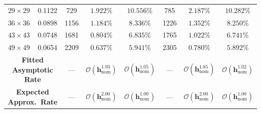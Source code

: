 \documentclass[VANCOUVER,Times1COL]{WileyNJD-v5}
\begin{document}
\begin{table}[!t]
{\begin{tabular}{cc|ccc|ccc}
            $29 \times 29$                                       & 0.1122                                       & 729                                                  & $1.922\%$                                                           & $10.556\%$                                          & 785                                                 & $2.187\%$                                           & $10.282\%$                                          \\
            $36 \times 36$                                       & 0.0898                                       & 1156                                                 & $1.184\%$                                                           & $8.336\%$                                           & 1226                                                & $1.352\%$                                           & $8.250\%$                                           \\
            $43 \times 43$                                       & 0.0748                                       & 1681                                                 & $0.804\%$                                                           & $6.835\%$                                           & 1765                                                & $1.022\%$                                           & $6.741\%$                                           \\
            $49 \times 49$                                       & 0.0654                                       & 2209                                                 & $0.637\%$                                                           & $5.941\%$                                           & 2305                                                & $0.780\%$                                           & $5.892\%$                                           \\
            \midrule
            \multicolumn{2}{c|}{\textbf{Fitted Asymptotic Rate}} & ---                                          & $\boldsymbol{\mathcal{O}(h_{\mathrm{nom}}^{1.93})}$  & $\boldsymbol{\mathcal{O}(h_{\mathrm{nom}}^{1.05})}$                 & ---                                                 & $\boldsymbol{\mathcal{O}(h_{\mathrm{nom}}^{1.85})}$ & $\boldsymbol{\mathcal{O}(h_{\mathrm{nom}}^{1.02})}$ \\
            \multicolumn{2}{c|}{\textbf{Expected Approx.\ Rate}} & ---                                          & $\boldsymbol{\mathcal{O}(h_{\mathrm{nom}}^{2.00})}$  & $\boldsymbol{\mathcal{O}(h_{\mathrm{nom}}^{1.00})}$                 & ---                                                 & $\boldsymbol{\mathcal{O}(h_{\mathrm{nom}}^{2.00})}$ & $\boldsymbol{\mathcal{O}(h_{\mathrm{nom}}^{1.00})}$ \\
            \bottomrule
        \end{tabular}
    }
\end{table}
\end{document}
